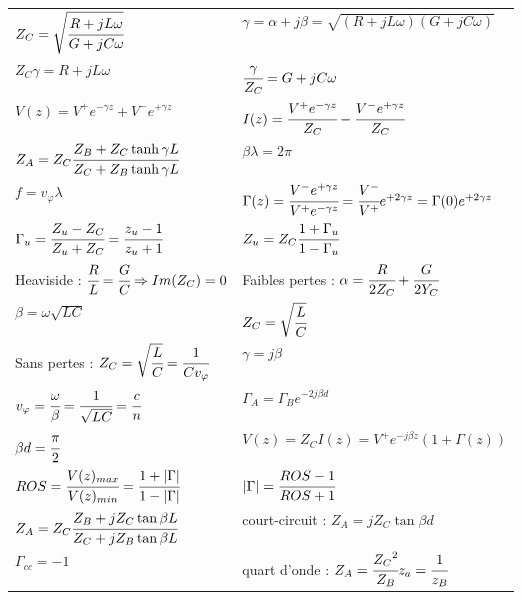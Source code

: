 \documentclass[11pt;a4paper]{article}
\begin{document}
\begin{tabular}{ll}

$Z_C = \sqrt{\cfrac{R+jL\omega}{G+jC\omega}}$ & $\gamma = \alpha + j \beta = \sqrt{(R+jL\omega)(G+jC\omega)}$ \\

$Z_C \gamma = R+jL\omega$ & $\cfrac{\gamma}{Z_C} = G+jC\omega$\\

$V(z) = V^+e^{-\gamma z} + V^-e^{+\gamma z}$ & $I(z) = \cfrac{V^+e^{-\gamma z}}{Z_C} - \cfrac{V^-e^{+\gamma z}}{Z_C}$\\

$Z_A = Z_C\cfrac{Z_B+Z_C \tanh{\gamma L}}{Z_C+Z_B \tanh{\gamma L}}$ & $\beta \lambda = 2 \pi$\\

$f = v_\varphi \lambda$ & $\Gamma(z)=\cfrac{V^-e^{+\gamma z}}{V^+e^{-\gamma z}} = \cfrac{V^-}{V^+}e^{+2\gamma z} = \Gamma(0) e^{+2\gamma z}$\\

$\Gamma_u=\cfrac{Z_u-Z_C}{Z_u+Z_C}=\cfrac{z_u-1}{z_u+1}$ & $Z_u = Z_C \cfrac{1+\Gamma_u}{1-\Gamma_u}$\\

Heaviside : $\cfrac RL=\cfrac GC \Rightarrow Im(Z_C) = 0$ & Faibles pertes : $\alpha = \cfrac R{2 Z_C} + \cfrac G{2Y_C}$\\

$\beta=\omega \sqrt{LC}$ & $Z_C=\sqrt{\cfrac LC}$\\

Sans pertes : $Z_C=\sqrt{\cfrac LC} = \cfrac 1{Cv_\varphi}$ & $\gamma=j\beta$ \\

$v_\varphi=\cfrac\omega\beta=\cfrac 1{\sqrt{LC}}=\cfrac c n$ & $\Gamma_A=\Gamma_Be^{-2j\beta d} $\\

$\beta d = \cfrac \pi 2$ & $V(z) =Z_CI(z)= V^+e^{-j\beta z}(1+\Gamma(z))$\\

$ROS=\cfrac{V(z)_{max}}{V(z)_{min}}=\cfrac{1+| \Gamma|}{1-|\Gamma|}$ & $|\Gamma|=\cfrac{ROS-1}{ROS+1}$\\

$Z_A=Z_C\cfrac{Z_B+jZ_C\tan{\beta L}}{Z_C+jZ_B\tan{\beta L}}$ & court-circuit : $Z_A = jZ_C\tan{\beta d}$\\

$\Gamma_{cc}=-1$ & quart d'onde : $Z_A=\cfrac{{Z_C}^2}{Z_B} z_a=\cfrac{1}{z_B}$

\end{tabular}
\end{document}
